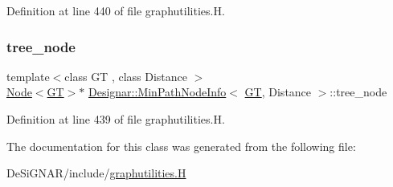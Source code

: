 Definition at line 440 of file graphutilities.\+H.

\mbox{\label{class_designar_1_1_min_path_node_info_a0121695ed8523a60ee92375767a5c169}} 
\subsubsection{\texorpdfstring{tree\+\_\+node}{tree\_node}}
{\footnotesize\ttfamily template$<$class GT , class Distance $>$ \\
\hyperlink{namespace_designar_a5af326c65aa2bd26b26c410f2030d09e}{Node}$<$\hyperlink{demo-buildgraph_8_c_a3001c40d2c31ca87ed96cd7d1334a55e}{GT}$>$$\ast$ \hyperlink{class_designar_1_1_min_path_node_info}{Designar\+::\+Min\+Path\+Node\+Info}$<$ \hyperlink{demo-buildgraph_8_c_a3001c40d2c31ca87ed96cd7d1334a55e}{GT}, Distance $>$\+::tree\+\_\+node}



Definition at line 439 of file graphutilities.\+H.



The documentation for this class was generated from the following file\+:\begin{DoxyCompactItemize}
\item 
De\+Si\+G\+N\+A\+R/include/\hyperlink{graphutilities_8_h}{graphutilities.\+H}\end{DoxyCompactItemize}
